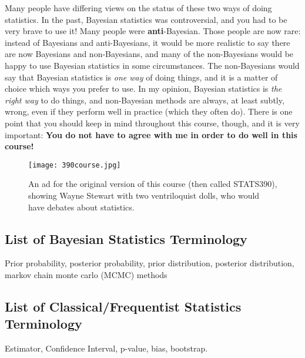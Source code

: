 Many
people have differing views on the status of these two ways of doing statistics.
In the past, Bayesian statistics was controversial, and you had to be very
brave to use it! Many people were {\bf anti}-Bayesian. Those people are now
rare: instead of Bayesians and anti-Bayesians, it would be more realistic to
say there are now Bayesians and non-Bayesians, and many of the non-Bayesians
would be happy to use Bayesian statistics in some circumstances.
The non-Bayesians would say that
Bayesian statistics is {\it one way} of doing things, and it is a matter of
choice which ways you prefer to use. In my opinion, Bayesian
statistics is {\it the right way} to do things, and non-Bayesian methods are
always, at least subtly, wrong, even if they perform well in practice (which
they often do). There is one point that you should keep in mind throughout
this course, though, and it is very important:
{\bf You do not have to agree with me in order to do well in this course!}

\begin{figure}
\begin{center}
\texttt{[image: 390course.jpg]}
\end{center}
\caption{An ad for the original version of this course (then called
STATS390), showing Wayne Stewart with two ventriloquist dolls, who would
have debates about statistics.\label{fig:wayne}}
\end{figure}

\subsection{List of Bayesian Statistics Terminology}
Prior probability, posterior probability, prior distribution, posterior
distribution, markov chain monte carlo (MCMC) methods

\subsection{List of Classical/Frequentist Statistics Terminology}
Estimator, Confidence Interval, p-value, bias, bootstrap.

